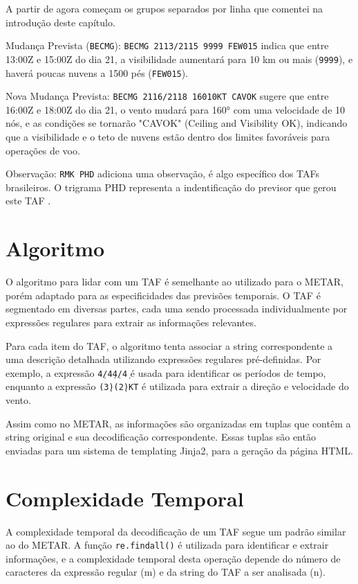 A partir de agora começam os grupos separados por linha que comentei na introdução deste
capítulo.

Mudança Prevista (\texttt{BECMG}):
\texttt{BECMG 2113/2115 9999 FEW015} indica que entre 13:00Z e 15:00Z do dia 21,
a visibilidade aumentará para 10 km ou mais (\texttt{9999}), e haverá poucas nuvens
a 1500 pés (\texttt{FEW015}).

Nova Mudança Prevista:
\texttt{BECMG 2116/2118 16010KT CAVOK} sugere que entre 16:00Z e 18:00Z do dia 21,
o vento mudará para 160° com uma velocidade de 10 nós, e as condições se tornarão
"CAVOK" (Ceiling and Visibility OK), indicando que a visibilidade e o teto de nuvens
estão dentro dos limites favoráveis para operações de voo.

Observação:
\texttt{RMK PHD} adiciona uma observação, é algo específico dos TAFs brasileiros.
O trigrama PHD representa a indentificação do previsor que gerou este TAF \cite{trigrama-taf}.

\section{Algoritmo}

O algoritmo para lidar com um TAF é semelhante ao utilizado para o METAR, porém adaptado
para as especificidades das previsões temporais. O TAF é segmentado em diversas
partes, cada uma sendo processada individualmente por expressões regulares para extrair as
informações relevantes.

Para cada item do TAF, o algoritmo tenta associar a string correspondente a uma descrição
detalhada utilizando expressões regulares pré-definidas. Por exemplo, a expressão
\texttt{\d4/\d4\d4/\d4} é usada para identificar os períodos de tempo, enquanto a expressão
\texttt{(\d{3})(\d{2})KT} é utilizada para extrair a direção e velocidade do vento.

Assim como no METAR, as informações são organizadas em tuplas que contêm a string original
e sua decodificação correspondente. Essas tuplas são então enviadas para um sistema de
templating Jinja2, para a geração da página HTML.

\section{Complexidade Temporal}

A complexidade temporal da decodificação de um TAF segue um padrão similar ao do METAR.
A função \texttt{re.findall()} é utilizada para identificar e extrair informações, e a
complexidade temporal desta operação depende do número de caracteres da expressão regular
(m) e da string do TAF a ser analisada (n).

